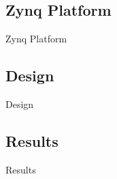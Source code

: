 \subsection{Zynq Platform}
\begin{frame}[label=zynq]{Zynq Platform}
\end{frame}

\subsection{Design}
\begin{frame}[label=design]{Design}
\end{frame}

\subsection{Results}
\begin{frame}[label=results]{Results}
\end{frame}
